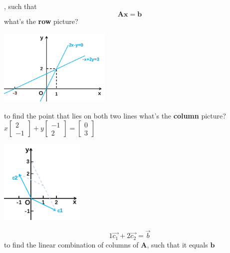 \documentclass[12pt, a4paper]{article}
\begin{document}
, such that
\begin{displaymath}
{\mathbf{A}}{\mathbf{x}}={\mathbf{b}}
\end{displaymath}
\vspace{14pt}
what's the {\textcolor{anhao-scarlet}{\bf{row}}} picture?
\begin{center}
\includegraphics[width=0.4\textwidth]{figures/S1-1.png}
\end{center}
{\textcolor{anhao-purple}{to find the point that lies on both two lines}}
\newline
what's the {\textcolor{anhao-scarlet}{\bf{column}}} picture?
\newline
\begin{math}
x 
\begin{bmatrix}
	2 \\
	-1
\end{bmatrix}
+
y
\begin{bmatrix}
	-1 \\
	2
\end{bmatrix}
=
\begin{bmatrix}
	0 \\
	3
\end{bmatrix}
\end{math}
\begin{center}
\includegraphics[width=0.3\textwidth]{figures/S1-2.png}
\end{center}
\begin{displaymath}
1{\overrightarrow{c_1}}+2{\overrightarrow{c_2}}={\overrightarrow{b}}
\end{displaymath}
{\textcolor{anhao-purple}{to find the linear combination of columns of ${\mathbf{A}}$, such that it equals ${\mathbf{b}}$}}
\vspace{14pt}
\end{document}
